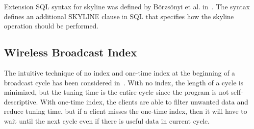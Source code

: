 


Extension SQL syntax for skyline was defined by B{\"o}rzs{\"o}nyi et al. in~\cite{conf/icde/BorzsonyiKS01}. The syntax defines an additional SKYLINE clause in SQL that specifies how the skyline operation should be performed. %

\subsection{Wireless Broadcast Index}\label{sec:wireless_bcast_index}


The intuitive technique of no index and one-time index at the beginning of a broadcast cycle has been considered in~\cite{journals/tkde/ImielinskiVB97}. With no index, the length of a cycle is minimized, but the tuning time is the entire cycle since the program is not self-descriptive. With one-time index, the clients are able to filter unwanted data and reduce tuning time, but if a client misses the one-time index, then it will have to wait until the next cycle even if there is useful data in current cycle.

